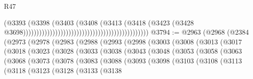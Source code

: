 \begin{lexlean}{R47}
\begin{coremodule}
                                                                                  (@3393
                                                                                    (@3398
                                                                                      (@3403
                                                                                        (@3408
                                                                                          (@3413
                                                                                            (@3418
                                                                                              (@3423
                                                                                                (@3428
                                                                                                  @3698)))))))))))))))))))))))))))))))))))))))))))))))
@3794 := @2963
    (@2968
      (@2384
        (@2973
          (@2978
            (@2983
              (@2988
                (@2993
                  (@2998
                    (@3003
                      (@3008
                        (@3013
                          (@3017
                            (@3018
                              (@3023
                                (@3028
                                  (@3033
                                    (@3038
                                      (@3043
                                        (@3048
                                          (@3053
                                            (@3058
                                              (@3063
                                                (@3068
                                                  (@3073
                                                    (@3078
                                                      (@3083
                                                        (@3088
                                                          (@3093
                                                            (@3098
                                                              (@3103
                                                                (@3108
                                                                  (@3113
                                                                    (@3118
                                                                      (@3123
                                                                        (@3128
                                                                          (@3133
                                                                            (@3138

\end{coremodule}
\end{lexlean}
